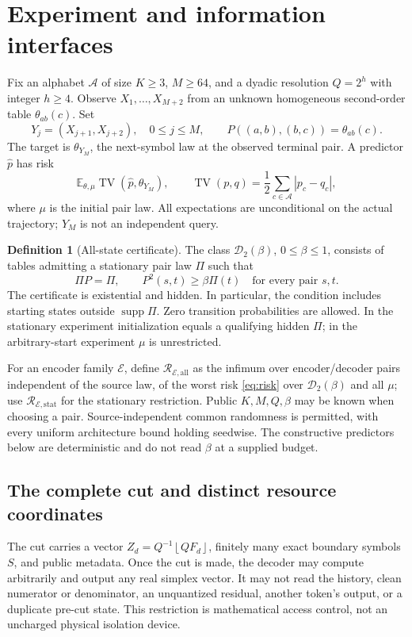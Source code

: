\documentclass[11pt,letterpaper]{article}
\theoremstyle{definition}\newtheorem{definition}[theorem]{Definition}
\theoremstyle{remark}\newtheorem{remark}[theorem]{Remark}
\newcommand{\TV}{\operatorname{TV}}
\newcommand{\E}{\mathbb{E}}
\newcommand{\floor}[1]{\left\lfloor #1\right\rfloor}
\newcommand{\Risk}{\mathcal{R}}
\newcommand{\Dclass}{\mathcal{D}_2(\beta)}
\newcommand{\supp}{\operatorname{supp}}
\begin{document}
\section{Experiment and information interfaces}\label{sec:experiment}
Fix an alphabet $\mathcal A$ of size $K\ge3$, $M\ge64$, and a dyadic resolution $Q=2^h$ with integer $h\ge4$. Observe $X_1,\ldots,X_{M+2}$ from an unknown homogeneous second-order table $\theta_{ab}(c)$. Set
\[
 Y_j=(X_{j+1},X_{j+2}),\quad 0\le j\le M,
 \qquad P((a,b),(b,c))=\theta_{ab}(c).
\]
The target is $\theta_{Y_M}$, the next-symbol law at the observed terminal pair. A predictor $\widehat p$ has risk
\begin{equation}\label{eq:risk}
 \E_{\theta,\mu}\TV(\widehat p,\theta_{Y_M}),
 \qquad \TV(p,q)=\frac12\sum_{c\in\mathcal A}|p_c-q_c|,
\end{equation}
where $\mu$ is the initial pair law. All expectations are unconditional on the actual trajectory; $Y_M$ is not an independent query.

\begin{definition}[All-state certificate]
The class $\Dclass$, $0\le\beta\le1$, consists of tables admitting a stationary pair law $\Pi$ such that
\begin{equation}\label{eq:minor}
 \Pi P=\Pi,\qquad P^2(s,t)\ge\beta\Pi(t)\quad\text{for every pair }s,t.
\end{equation}
The certificate is existential and hidden. In particular, the condition includes starting states outside $\supp\Pi$. Zero transition probabilities are allowed. In the stationary experiment initialization equals a qualifying hidden $\Pi$; in the arbitrary-start experiment $\mu$ is unrestricted.
\end{definition}

For an encoder family $\mathcal E$, define $\Risk_{\mathcal E,\mathrm{all}}$ as the infimum over encoder/decoder pairs independent of the source law, of the worst risk \eqref{eq:risk} over $\Dclass$ and all $\mu$; use $\Risk_{\mathcal E,\mathrm{stat}}$ for the stationary restriction. Public $K,M,Q,\beta$ may be known when choosing a pair. Source-independent common randomness is permitted, with every uniform architecture bound holding seedwise. The constructive predictors below are deterministic and do not read $\beta$ at a supplied budget.

\subsection{The complete cut and distinct resource coordinates}
The cut carries a vector $Z_d=Q^{-1}\floor{QF_d}$, finitely many exact boundary symbols $S$, and public metadata. Once the cut is made, the decoder may compute arbitrarily and output any real simplex vector. It may not read the history, clean numerator or denominator, an unquantized residual, another token's output, or a duplicate pre-cut state. This restriction is mathematical access control, not an uncharged physical isolation device.
\end{document}
